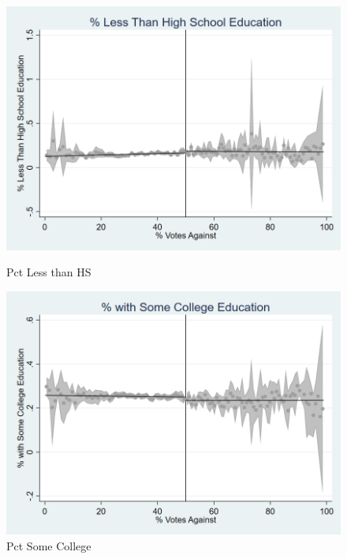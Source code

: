 \begin{figure}[ht]
    
    \begin{minipage}[b]{0.40\textwidth}
        \centering
        \includegraphics[width=\textwidth,keepaspectratio]{images/cov_smoothness_pctlesshs.png}
        \caption*{Pct Less than HS}
        \label{fig:pctlesshs_sm}
    \end{minipage}
    \hfill
    \begin{minipage}[b]{0.40\textwidth}
        \centering
        \includegraphics[width=\textwidth,keepaspectratio]{images/cov_smoothness_pctsomecoll.png}
        \caption*{Pct Some College}
        \label{fig:pctsomecoll_sm}
    \end{minipage}
    

\end{figure}
